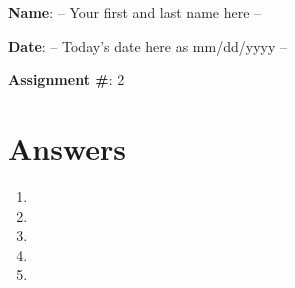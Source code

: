 \documentclass[12pt]{article}
\begin{document}
\textbf{Name}: -- Your first and last name here --

\textbf{Date}: -- Today's date here as mm/dd/yyyy --

\textbf{Assignment \#}: 2

\hrulefill

\section*{Answers}

\begin{enumerate}
\item
\item
\item
\item
\item
\end{enumerate}
\end{document}
